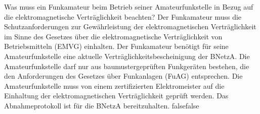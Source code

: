     {Was muss ein Funkamateur beim Betrieb seiner Amateurfunkstelle in Bezug auf die elektromagnetische Verträglichkeit beachten?}
    {Der Funkamateur muss die Schutzanforderungen zur Gewährleistung der elektromagnetischen Verträglichkeit im Sinne des Gesetzes über die elektromagnetische Verträglichkeit von Betriebsmitteln (EMVG) einhalten.}
    {Der Funkamateur benötigt für seine Amateurfunkstelle eine aktuelle  Verträglichkeitsbescheinigung der BNetzA.
}
    {Die Amateurfunkstelle darf nur aus baumustergeprüften Funkgeräten bestehen, die den Anforderungen des Gesetzes über Funkanlagen (FuAG) entsprechen.}
    {Die Amateurfunkstelle muss von einem zertifizierten Elektromeister auf die Einhaltung der elektromagnetischen Verträglichkeit geprüft werden. Das Abnahmeprotokoll ist für die BNetzA bereitzuhalten.
}
    {false}{false}